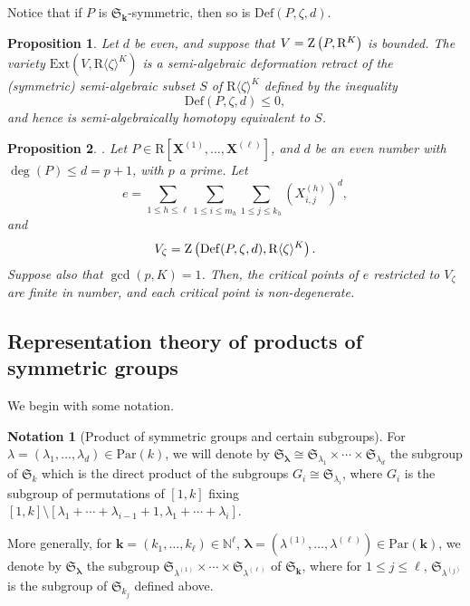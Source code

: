 \documentclass{amsart}
\newtheorem{proposition}{Proposition}
\theoremstyle{definition}
\newtheorem{notation}{Notation}
\theoremstyle{remark}
\numberwithin{equation}{section}
\begin{document}
Notice that if $P$ is $\mathfrak{S}_{\mathbf{k}}$-symmetric,
then so is ${\mathrm{Def}} (P,\zeta ,d)$.

\begin{proposition}\cite[Proposition 4]{BC2013}
  \label{prop:alg-to-semialg}
 Let $d$ be even, and suppose that $V = {{\rm Z}} \left(P, {\mathrm{R}}^{K} \right)$ is bounded. 
 The variety
  ${\mathrm{Ext}} \left(V, {\mathrm{R}} \langle \zeta \rangle^{K} \right)$ is a semi-algebraic
  deformation retract of the (symmetric) semi-algebraic subset $S$ of ${\mathrm{R}}
  \langle \zeta \rangle^{K}$ defined by the inequality 
  \[
  {\mathrm{Def}} (P, \zeta ,d) \leq 0,
  \] 
  and hence is semi-algebraically homotopy equivalent to $S$.
 \end{proposition}

\begin{proposition}\cite[Proposition 5]{BC2013}.
  \label{prop:non-degenerate}
  Let 
  $P \in {\mathrm{R}} [ {\mathbf{X}}^{(1)} , \ldots, {\mathbf{X}}^{(\ell)} ]$,
  and
  $d$ be an even number with $\deg (P) \leq d=p+1$, with $p$ a prime. Let
  \[
  e = \sum_{1\leq h\leq \ell}\sum_{1 \leq i\leq m_h} \sum_{1\leq j\leq k_h}  (X^{(h)}_{i,j})^{d},
  \] and
  \[
  V_{\zeta} = {{\rm Z}} \left({\mathrm{Def}} (P,\zeta ,d) , {\mathrm{R}} \langle \zeta \rangle^{K} \right).
  \] 
  Suppose also that $\gcd(p,K) =1$. Then, the critical points of $e$ restricted to $V_{\zeta}$ are
  finite in number, and each critical point is non-degenerate.
\end{proposition}

    
\subsection{Representation theory of products of symmetric groups}
\label{subsec:representation-of-Sn}
We begin with some notation.

\begin{notation}[Product of symmetric groups and certain subgroups]
For $\lambda =(\lambda_1,\ldots, \lambda_d) \in {\mathrm{Par}}(k)$, we will denote by 
$\mathfrak{S}_{\pmb{\lambda}} \cong \mathfrak{S}_{\lambda_1} \times \cdots \times \mathfrak{S}_{\lambda_d}$ the subgroup of 
$\mathfrak{S}_k$ which is the direct product of the subgroups $G_i \cong \mathfrak{S}_{\lambda_i}$, where $G_i$ is the subgroup
of permutations of $[1,k]$ fixing $[1,k] \setminus [\lambda_1+\cdots+\lambda_{i-1}+1, \lambda_1+\cdots+\lambda_i]$.

More generally, for ${\mathbf{k}} = (k_1,\ldots,k_\ell) \in {\mathbb{N}}^\ell$, $\pmb{\lambda} = (\lambda^{(1)},\ldots,\lambda^{(\ell)}) \in {\mathrm{Par}}({\mathbf{k}})$, we denote by 
$\mathfrak{S}_{\pmb{\lambda}}$ the subgroup $\mathfrak{S}_{\lambda^{(1)}} \times \cdots \times \mathfrak{S}_{\lambda^{(\ell)}}$ of
$\mathfrak{S}_{\mathbf{k}}$, where for $1 \leq j \leq \ell$, $\mathfrak{S}_{\lambda^{(j)}}$ is the subgroup of $\mathfrak{S}_{k_j}$ defined
above. 
\end{notation}
\end{document}
